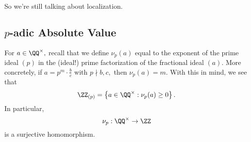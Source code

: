 \documentclass[../notes.tex]{subfiles}
\begin{document}

















So we're still talking about localization.

\subsection{\texorpdfstring{$p$}{}-adic Absolute Value}
For $a\in\QQ^\times,$ recall that we define $\nu_p(a)$ equal to the exponent of the prime ideal $(p)$ in the (ideal!) prime factorization of the fractional ideal $(a).$ More concretely, if $a=p^m\cdot\frac bc$ with $p\nmid b,c,$ then $\nu_p(a)=m.$ With this in mind, we see that
\[\ZZ_{(p)}=\left\{a\in\QQ^\times:\nu_p(a)\ge0\right\}.\]
In particular,
\[\nu_p:\QQ^\times\to\ZZ\]
is a surjective homomorphism.
\end{document}
